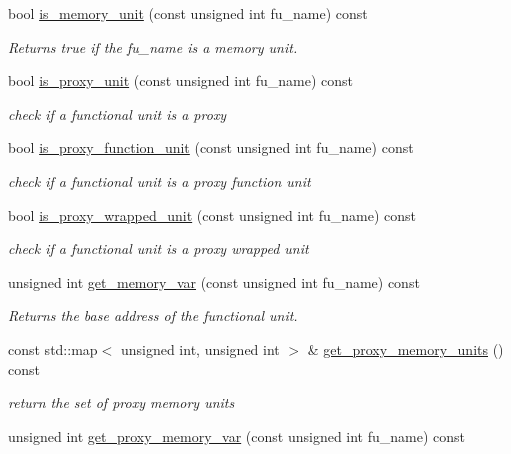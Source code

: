 \begin{DoxyCompactItemize}
bool \hyperlink{classAllocationInformation_aff3cc55dcb47a850812a142dc9b1b6b9}{is\+\_\+memory\+\_\+unit} (const unsigned int fu\+\_\+name) const
\begin{DoxyCompactList}\small\item\em Returns true if the fu\+\_\+name is a memory unit. \end{DoxyCompactList}\item 
bool \hyperlink{classAllocationInformation_a62bd7f98935c32e3e634c27994382ed1}{is\+\_\+proxy\+\_\+unit} (const unsigned int fu\+\_\+name) const
\begin{DoxyCompactList}\small\item\em check if a functional unit is a proxy \end{DoxyCompactList}\item 
bool \hyperlink{classAllocationInformation_ae1bd5d0f2008ba69461691144bbdc07f}{is\+\_\+proxy\+\_\+function\+\_\+unit} (const unsigned int fu\+\_\+name) const
\begin{DoxyCompactList}\small\item\em check if a functional unit is a proxy function unit \end{DoxyCompactList}\item 
bool \hyperlink{classAllocationInformation_a64b03e943913927efd6cfb97feaf0e47}{is\+\_\+proxy\+\_\+wrapped\+\_\+unit} (const unsigned int fu\+\_\+name) const
\begin{DoxyCompactList}\small\item\em check if a functional unit is a proxy wrapped unit \end{DoxyCompactList}\item 
unsigned int \hyperlink{classAllocationInformation_aca7d9a076d5c26ffe60388b0b59a9903}{get\+\_\+memory\+\_\+var} (const unsigned int fu\+\_\+name) const
\begin{DoxyCompactList}\small\item\em Returns the base address of the functional unit. \end{DoxyCompactList}\item 
const std\+::map$<$ unsigned int, unsigned int $>$ \& \hyperlink{classAllocationInformation_afb4a53f5f1daeffafcacd5a2a821234c}{get\+\_\+proxy\+\_\+memory\+\_\+units} () const
\begin{DoxyCompactList}\small\item\em return the set of proxy memory units \end{DoxyCompactList}\item 
unsigned int \hyperlink{classAllocationInformation_a9e8ab22244016fcbcb7f6ef2f8934054}{get\+\_\+proxy\+\_\+memory\+\_\+var} (const unsigned int fu\+\_\+name) const

\end{DoxyCompactItemize}
